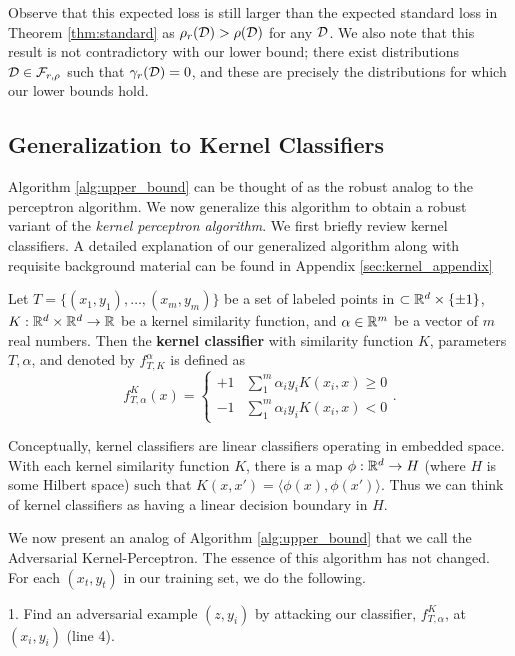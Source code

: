Observe that this expected loss is still larger than the expected standard loss in  Theorem \ref{thm:standard} as $\rho_r({\mathcal D}) > \rho({\mathcal D})$ for any ${\mathcal D}$. We also note that this result is not contradictory with our lower bound; there exist distributions ${\mathcal D} \in {\mathcal F}_{r, \rho}$ such that $\gamma_r({\mathcal D}) = 0$, and these are precisely the distributions for which our lower bounds hold.

\subsection{Generalization to Kernel Classifiers}

Algorithm \ref{alg:upper_bound} can be thought of as the robust analog to the perceptron algorithm. We now generalize this algorithm to obtain a robust variant of the \textit{kernel perceptron algorithm}. We first briefly review kernel classifiers. A detailed explanation of our generalized algorithm along with requisite background material can be found in Appendix \ref{sec:kernel_appendix}

\begin{defn}\label{defn:kernel}
Let $T = \{(x_1, y_1), \dots, (x_m, y_m)\}$ be a set of labeled points in $\subset \mathbb R^d \times \{\pm 1\}$, $K: \mathbb R^d \times \mathbb R^d \to \mathbb R$ be a kernel similarity function, and $\alpha \in \mathbb R^m$ be a vector of $m$ real numbers. Then the \textbf{kernel classifier} with similarity function $K$, parameters $T, \alpha$, and denoted by $f_{T, K}^\alpha$ is defined as $$f_{T, \alpha}^K(x) = \begin{cases} +1 &  \sum_1^m \alpha_iy_iK(x_i, x) \geq 0\\ -1 &  \sum_1^m \alpha_iy_iK(x_i, x) < 0  \end{cases}.$$
\end{defn}

Conceptually, kernel classifiers are linear classifiers operating in embedded space. With each kernel similarity function $K$, there is a map $\phi: \mathbb R^d \to H$ (where $H$ is some Hilbert space) such that $K(x, x') = \langle \phi(x), \phi(x') \rangle$. Thus we can think of kernel classifiers as having a linear decision boundary in $H$. 

We now present an analog of Algorithm \ref{alg:upper_bound} that we call the Adversarial Kernel-Perceptron. The essence of this algorithm has not changed. For each $(x_t, y_t)$ in our training set, we do the following.

1. Find an adversarial example $(z, y_i)$ by attacking our classifier, $f_{T, \alpha}^K$, at $(x_i, y_i)$ (line 4). 

